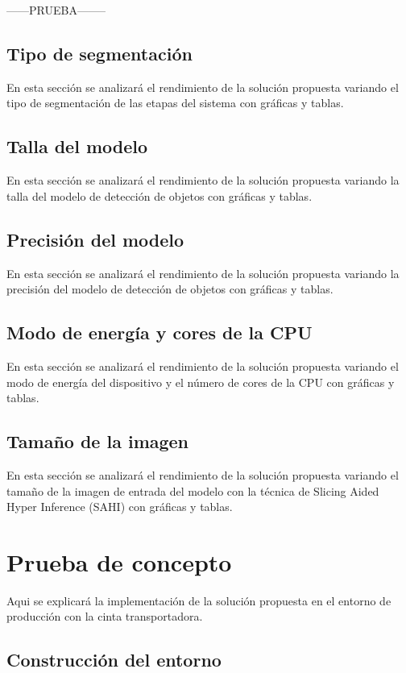 \documentclass[11pt,spanish,listoffigures,listoftables]{tfgetsinf}
\begin{document}
------PRUEBA--------



\section{Tipo de segmentación}
En esta sección se analizará el rendimiento de la solución propuesta variando el tipo de segmentación de las etapas del sistema con gráficas y tablas.

\section{Talla del modelo}
En esta sección se analizará el rendimiento de la solución propuesta variando la talla del modelo de detección de objetos con gráficas y tablas.

\section{Precisión del modelo}
En esta sección se analizará el rendimiento de la solución propuesta variando la precisión del modelo de detección de objetos con gráficas y tablas.

\section{Modo de energía y cores de la CPU}
En esta sección se analizará el rendimiento de la solución propuesta variando el modo de energía del dispositivo y el número de cores de la CPU con gráficas y tablas.

\section{Tamaño de la imagen}
En esta sección se analizará el rendimiento de la solución propuesta variando el tamaño de la imagen de entrada del modelo con la técnica de Slicing Aided Hyper Inference (SAHI) con gráficas y tablas.

\chapter{Prueba de concepto}
Aqui se explicará la implementación de la solución propuesta en el entorno de producción con la cinta transportadora.

\section{Construcción del entorno}
\end{document}
